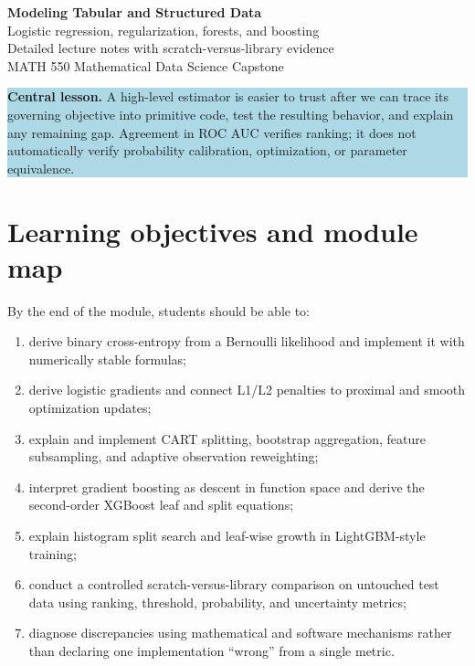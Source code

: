 \documentclass[11pt]{article}
\newcommand{\aside}[1]{\colorbox{lightblue}{\parbox{0.96\linewidth}{#1}}}
\begin{document}
\begin{center}
{\LARGE\bfseries\color{navy} Modeling Tabular and Structured Data}\\[5pt]
{\Large Logistic regression, regularization, forests, and boosting}\\[8pt]
{\large Detailed lecture notes with scratch-versus-library evidence}\\[10pt]
MATH 550 Mathematical Data Science Capstone
\end{center}

\aside{\textbf{Central lesson.} A high-level estimator is easier to trust after
we can trace its governing objective into primitive code, test the resulting
behavior, and explain any remaining gap. Agreement in ROC AUC verifies ranking;
it does not automatically verify probability calibration, optimization, or
parameter equivalence.}

\tableofcontents
\newpage

\section{Learning objectives and module map}

By the end of the module, students should be able to:

\begin{enumerate}
\item derive binary cross-entropy from a Bernoulli likelihood and implement it
with numerically stable formulas;
\item derive logistic gradients and connect L1/L2 penalties to proximal and
smooth optimization updates;
\item explain and implement CART splitting, bootstrap aggregation, feature
subsampling, and adaptive observation reweighting;
\item interpret gradient boosting as descent in function space and derive the
second-order XGBoost leaf and split equations;
\item explain histogram split search and leaf-wise growth in LightGBM-style
training;
\item conduct a controlled scratch-versus-library comparison on untouched test
data using ranking, threshold, probability, and uncertainty metrics;
\item diagnose discrepancies using mathematical and software mechanisms rather
than declaring one implementation ``wrong'' from a single metric.
\end{enumerate}
\end{document}
